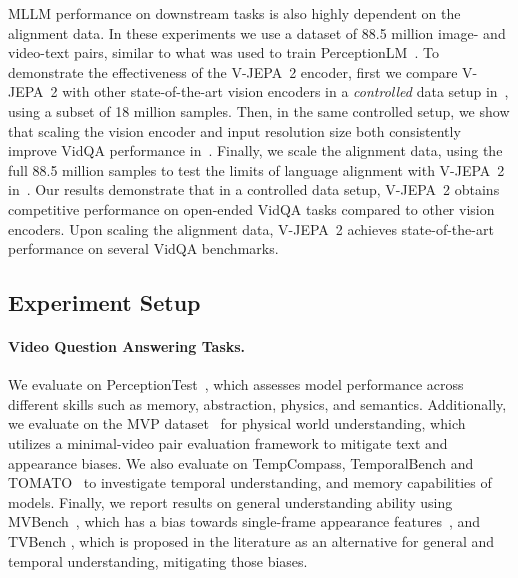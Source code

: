 \documentclass[]{fairmeta}
\newcommand{\model}{V-JEPA~2\xspace}
\begin{document}
MLLM performance on downstream tasks is also highly dependent on the alignment data. In these experiments we use a dataset of 88.5 million image- and video-text pairs, similar to what was used to train PerceptionLM~\citep{cho2025perceptionlm}. To demonstrate the effectiveness of the \model encoder, first we compare \model with other state-of-the-art vision encoders in a \textit{controlled} data setup in~, using a subset of 18 million samples. Then, in the same controlled setup, we show that scaling the vision encoder and input resolution size both consistently improve VidQA performance in~. Finally, we scale the alignment data, using the full 88.5 million samples to test the limits of language alignment with \model in~.
Our results demonstrate that in a controlled data setup, \model obtains competitive performance on open-ended VidQA tasks compared to other vision encoders. 
Upon scaling the alignment data, \model achieves state-of-the-art performance on several VidQA benchmarks.

\subsection{Experiment Setup}

\paragraph{\bf Video Question Answering Tasks.}
We evaluate on PerceptionTest~\citep{patraucean2023perception}, which assesses model performance across different skills such as memory, abstraction, physics, and semantics. Additionally, we evaluate on the MVP dataset~\citep{benno2024} for physical world understanding, which utilizes a minimal-video pair evaluation framework to mitigate text and appearance biases. We also evaluate on TempCompass, TemporalBench and TOMATO~\citep{liu2024tempcompass,cai2024temporalbench,shangguan2024tomato} to investigate temporal understanding, and memory capabilities of models. Finally, we report results on general understanding ability using MVBench~\citep{li2024mvbench}, which has a bias towards single-frame appearance features~\citep{benno2024,cores2024tvbench}, and TVBench \citep{cores2024tvbench}, which is proposed in the literature as an alternative for general and temporal understanding, mitigating those biases. 
\end{document}
